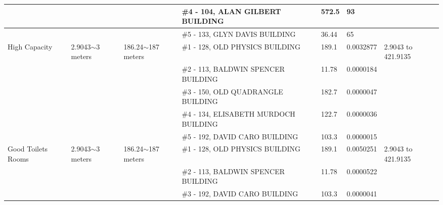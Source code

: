 \begin{table}[H]
{\begin{tabular}{|l|l|l|l|l|l|l|}
                   &                          &                                                 & \#4 - 104, ALAN GILBERT BUILDING                      & 572.5         & 93              &                           \\ \hline
                   &                          &                                                 & \#5 - 133, GLYN DAVIS BUILDING                        & 36.44         & 65              &                           \\ \hline
High Capacity      & 2.9043$\sim$3 meters     & 186.24$\sim$187 meters                          & \#1 - 128, OLD PHYSICS BUILDING                       & 189.1         & 0.0032877       & 2.9043 to 421.9135        \\ \hline
                   &                          &                                                 & \#2 - 113, BALDWIN SPENCER BUILDING                   & 11.78         & 0.0000184       &                           \\ \hline
                   &                          &                                                 & \#3 - 150, OLD QUADRANGLE BUILDING                    & 182.7         & 0.0000047       &                           \\ \hline
                   &                          &                                                 & \#4 - 134, ELISABETH MURDOCH BUILDING                 & 122.7         & 0.0000036       &                           \\ \hline
                   &                          &                                                 & \#5 - 192, DAVID CARO BUILDING                        & 103.3         & 0.0000015       &                           \\ \hline
Good Toilets Rooms & 2.9043$\sim$3 meters     & 186.24$\sim$187 meters                          & \#1 - 128, OLD PHYSICS BUILDING                       & 189.1         & 0.0050251       & 2.9043 to 421.9135        \\ \hline
                   &                          &                                                 & \#2 - 113, BALDWIN SPENCER BUILDING                   & 11.78         & 0.0000522       &                           \\ \hline
                   &                          &                                                 & \#3 - 192, DAVID CARO BUILDING                        & 103.3         & 0.0000041       &                           \\ \hline

\end{tabular}}
\end{table}
